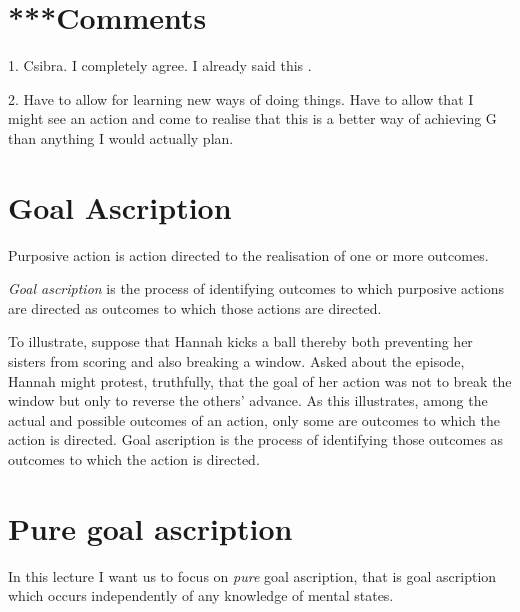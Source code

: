 \documentclass[12pt,\papersize]{extarticle}
\begin{document}
\setlength\footnotesep{1em}




\maketitle
%
%
%

\section{***Comments}
1. Csibra.  I completely agree.  I already said this \citep{Csibra:2007fy}.

2. Have to allow for learning new ways of doing things.  Have to allow that I might see an action and come to realise that this is a better way of achieving G than anything I would actually plan.


\section{Goal Ascription}
Purposive action is action directed to the realisation of one or more outcomes.

\newcommand{\dfGoalAscription}{\emph{Goal ascription} is the process of identifying outcomes to which purposive actions are directed as outcomes to which those actions are directed.}

\dfGoalAscription{}


To illustrate, suppose that
Hannah kicks a ball thereby both preventing her sisters from scoring and also breaking a window.
Asked about the episode,
Hannah might protest, truthfully, that the goal of her action was not to break the window but only to reverse the others' advance.
As this illustrates,
among the actual and possible outcomes of an action,
only some are outcomes to which the action is directed.
Goal ascription is the process of identifying 
 those outcomes as outcomes to which the action is directed.


\section{Pure goal ascription}
In this lecture I want us to focus on \emph{pure} goal ascription, that is goal ascription which occurs independently of any knowledge of mental states.
\end{document}
